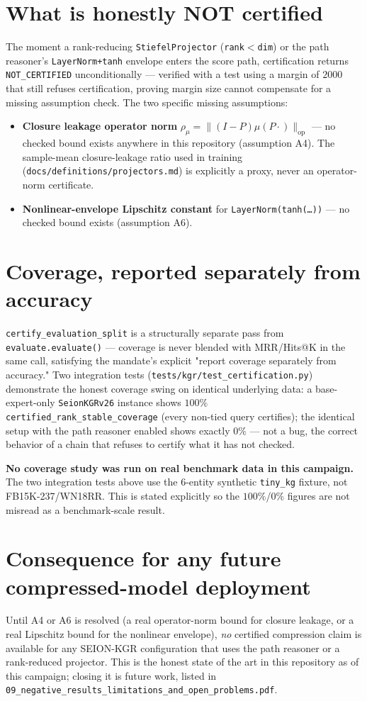 \documentclass[11pt]{article}
\begin{document}
\section{What is honestly NOT certified}
\label{sec:not-cert}
The moment a rank-reducing \texttt{StiefelProjector} (\texttt{rank}$<$\texttt{dim}) or the path
reasoner's \texttt{LayerNorm+tanh} envelope enters the score path, certification returns
\texttt{NOT\_CERTIFIED} unconditionally --- verified with a test using a margin of $2000$ that
still refuses certification, proving margin size cannot compensate for a missing assumption check.
The two specific missing assumptions:
\begin{itemize}
  \item \textbf{Closure leakage operator norm} $\rho_\mu = \|(I-P)\mu(P\cdot)\|_{\text{op}}$ ---
        no checked bound exists anywhere in this repository (assumption A4). The sample-mean
        closure-leakage ratio used in training (\texttt{docs/definitions/projectors.md}) is
        explicitly a proxy, never an operator-norm certificate.
  \item \textbf{Nonlinear-envelope Lipschitz constant} for \texttt{LayerNorm(tanh(\ldots))} ---
        no checked bound exists (assumption A6).
\end{itemize}

\section{Coverage, reported separately from accuracy}
\texttt{certify\_evaluation\_split} is a structurally separate pass from \texttt{evaluate.evaluate()}
--- coverage is never blended with MRR/Hits@K in the same call, satisfying the mandate's explicit
"report coverage separately from accuracy." Two integration tests
(\texttt{tests/kgr/test\_certification.py}) demonstrate the honest coverage swing on identical
underlying data: a base-expert-only \texttt{SeionKGRv26} instance shows $100\%$
\texttt{certified\_rank\_stable\_coverage} (every non-tied query certifies); the identical setup
with the path reasoner enabled shows exactly $0\%$ --- not a bug, the correct behavior of a chain
that refuses to certify what it has not checked.

\textbf{No coverage study was run on real benchmark data in this campaign.} The two integration
tests above use the 6-entity synthetic \texttt{tiny\_kg} fixture, not FB15K-237/WN18RR. This is
stated explicitly so the $100\%$/$0\%$ figures are not misread as a benchmark-scale result.

\section{Consequence for any future compressed-model deployment}
Until A4 or A6 is resolved (a real operator-norm bound for closure leakage, or a real Lipschitz
bound for the nonlinear envelope), \emph{no} certified compression claim is available for any
SEION-KGR configuration that uses the path reasoner or a rank-reduced projector. This is the
honest state of the art in this repository as of this campaign; closing it is future work, listed
in \texttt{09\_negative\_results\_limitations\_and\_open\_problems.pdf}.
\end{document}
